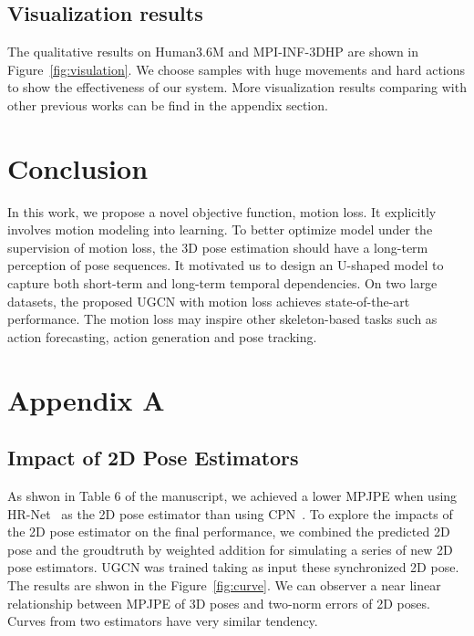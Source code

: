 \documentclass[runningheads]{llncs}
\begin{document}
\subsection{Visualization results}
The qualitative results on Human3.6M and MPI-INF-3DHP are shown in Figure~\ref{fig:visulation}.
We choose samples with huge movements and hard actions to show the effectiveness of our system.
More visualization results comparing with other previous works can be find in the appendix section.

\section{Conclusion}
In this work, we propose a novel objective function, motion loss.
It explicitly involves motion modeling into learning.
To better optimize model under the supervision of motion loss, the 3D pose estimation should have a long-term perception of pose sequences.
It motivated us to design an U-shaped model to capture both short-term and long-term temporal dependencies.
On two large datasets, the proposed UGCN with motion loss
achieves state-of-the-art performance.
The motion loss may inspire other skeleton-based tasks such as action forecasting, action generation and pose tracking.







\clearpage

\section*{Appendix A}
\subsection*{Impact of 2D Pose Estimators}

As shwon in Table 6 of the manuscript,
we achieved a lower MPJPE when using HR-Net~\cite{Sun_2019_CVPR} as the 2D pose estimator than using CPN~\cite{chen2018cascaded}.
To explore the impacts of the 2D pose estimator on the final performance, we combined the predicted 2D pose and the groudtruth by weighted addition for simulating a series of new 2D pose estimators.
UGCN was trained taking as input these synchronized 2D pose.
The results are shwon in the Figure~\ref{fig:curve}.
We can observer a near linear relationship between MPJPE of 3D poses and two-norm errors of 2D poses. Curves from two estimators have very similar tendency.
\end{document}
